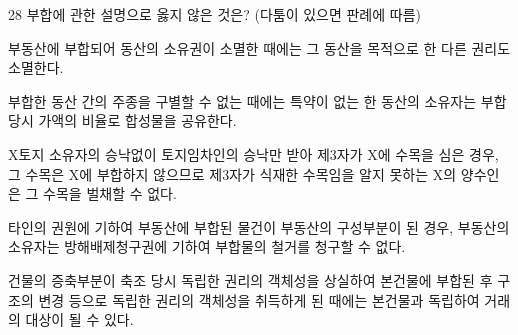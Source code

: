 \begin{question}{28}
부합에 관한 설명으로 옳지 않은 것은? (다툼이 있으면 판례에 따름)
\begin{choices}
  \item 부동산에 부합되어 동산의 소유권이 소멸한 때에는 그 동산을 목적으로 한 다른 권리도 소멸한다.
  \item 부합한 동산 간의 주종을 구별할 수 없는 때에는 특약이 없는 한 동산의 소유자는 부합당시 가액의 비율로 합성물을 공유한다.
  \item X토지 소유자의 승낙없이 토지임차인의 승낙만 받아 제3자가 X에 수목을 심은 경우, 그 수목은 X에 부합하지 않으므로 제3자가 식재한 수목임을 알지 못하는 X의 양수인은 그 수목을 벌채할 수 없다.
  \item 타인의 권원에 기하여 부동산에 부합된 물건이 부동산의 구성부분이 된 경우, 부동산의 소유자는 방해배제청구권에 기하여 부합물의 철거를 청구할 수 없다.
  \item 건물의 증축부분이 축조 당시 독립한 권리의 객체성을 상실하여 본건물에 부합된 후 구조의 변경 등으로 독립한 권리의 객체성을 취득하게 된 때에는 본건물과 독립하여 거래의 대상이 될 수 있다.
\end{choices}
\end{question}
